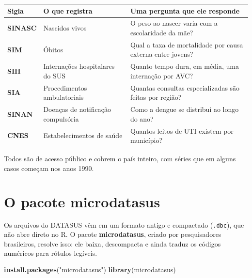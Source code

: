 \documentclass[
]{book}
\newenvironment{Shaded}{\begin{snugshade}}{\end{snugshade}}
\newcommand{\FunctionTok}[1]{\textcolor[rgb]{0.13,0.29,0.53}{\textbf{#1}}}
\newcommand{\NormalTok}[1]{#1}
\newcommand{\StringTok}[1]{\textcolor[rgb]{0.31,0.60,0.02}{#1}}
\newcounter{none} %
\begin{document}
{\def\LTcaptype{none} %
\begin{longtable}[]{@{}
  >{\raggedright\arraybackslash}p{}
  >{\raggedright\arraybackslash}p{}
  >{\raggedright\arraybackslash}p{}@{}}
\toprule\noalign{}
\begin{minipage}[b]{\linewidth}\raggedright
Sigla
\end{minipage} & \begin{minipage}[b]{\linewidth}\raggedright
O que registra
\end{minipage} & \begin{minipage}[b]{\linewidth}\raggedright
Uma pergunta que ele responde
\end{minipage} \\
\midrule\noalign{}
\endhead
\bottomrule\noalign{}
\endlastfoot
\textbf{SINASC} & Nascidos vivos & O peso ao nascer varia com a escolaridade da mãe? \\
\textbf{SIM} & Óbitos & Qual a taxa de mortalidade por causa externa entre jovens? \\
\textbf{SIH} & Internações hospitalares do SUS & Quanto tempo dura, em média, uma internação por AVC? \\
\textbf{SIA} & Procedimentos ambulatoriais & Quantas consultas especializadas são feitas por região? \\
\textbf{SINAN} & Doenças de notificação compulsória & Como a dengue se distribui ao longo do ano? \\
\textbf{CNES} & Estabelecimentos de saúde & Quantos leitos de UTI existem por município? \\
\end{longtable}
}

Todos são de acesso público e cobrem o país inteiro, com séries que em alguns casos começam nos anos 1990.

\section{O pacote microdatasus}\label{o-pacote-microdatasus}

Os arquivos do DATASUS vêm em um formato antigo e compactado (\texttt{.dbc}), que não abre direto no R. O pacote \textbf{microdatasus}, criado por pesquisadores brasileiros, resolve isso: ele baixa, descompacta e ainda traduz os códigos numéricos para rótulos legíveis.

\begin{Shaded}
\begin{Highlighting}[]
\FunctionTok{install.packages}\NormalTok{(}\StringTok{"microdatasus"}\NormalTok{)}
\FunctionTok{library}\NormalTok{(microdatasus)}
\end{Highlighting}
\end{Shaded}
\end{document}
